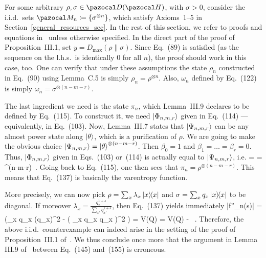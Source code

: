 \documentclass[11pt,notitlepage,tightenlines,nofootinbib,superscriptaddress]{revtex4-1}
\begin{document}
For some arbitrary $\rho,\sigma\in\D(\HH)$, with $\sigma>0$, consider the i.i.d.\ sets $\MM_n \coloneqq \{\sigma^{\otimes n}\}$, which satisfy Axioms~1--5 in Section~\ref{general_resources_sec}. In the rest of this section, we refer to proofs and equations in~\cite{Brandao2010} unless otherwise specified. In the direct part of the proof of Proposition~III.1, set $y = D_{\max}(\rho\|\sigma)$. Since Eq.~(89) is satisfied (as the sequence on the l.h.s.\ is identically $0$ for all $n$), the proof should work in this case, too. One can verify that under these assumptions the state $\rho_n$ constructed in Eq.~(90) using Lemma~C.5 is simply $\rho_n = \rho^{\otimes n}$. Also, $\omega_n$ defined by Eq.~(122) is simply $\omega_n = \sigma^{\otimes (n-m-r)}$. 

The last ingredient we need is the state $\pi_n$, which Lemma~III.9 declares to be defined by Eq.~(115). To construct it, we need $\ket{\Phi_{n,m,r}}$ given in Eq.~(114) --- equivalently, in Eq.~(103).
Now, Lemma~III.7 states that $\ket{\Psi_{n,m,r}}$ can be any almost power state along $\ket{\theta}$, which is a purification of $\rho$. We are going to make the obvious choice $\ket{\Psi_{n,m,r}} = \ket{\theta}^{\otimes (n-m-r)}$. Then $\beta_0 = 1$ and $\beta_1 = \ldots = \beta_r = 0$. Thus, $\ket{\Phi_{n,m,r}}$ given in Eqs.~(103) or~(114) is actually equal to $\ket{\Psi_{n,m,r}}$, i.e.
\bb
{} =  = \ket{\theta}^{\otimes(n-m-r)}\, .
\ee
Going back to Eq.~(115), one then sees that $\pi_n = \rho^{\otimes(n-m-r)}$. This means that Eq.~(137) is basically the varentropy function.

More precisely, we can now pick $\rho = \sum_x \lambda_x \ket{x}\!\!\bra{x}$ and $\sigma = \sum_x q_x \ket{x}\!\!\bra{x}$ to be diagonal. If moreover $\lambda_x = \frac{q_x^{1+s}}{\sum_{x'} q_{x'}^{1+s}}$, then Eq.~(137) yields immediately
\bb
\left|f''_n(s)\right| =  \left(\sum_x q_x (\log q_x)^2 - \left( \sum_x q_x \log q_x \right)^2 \right) =  V(Q) = V(Q) - \, .
\ee
Therefore, the above i.i.d.\ counterexample can indeed arise in the setting of the proof of Proposition~III.1 of~\cite{Brandao2010}. We thus conclude once more that the argument in Lemma III.9 of~\cite{Brandao2010} between Eq.~(145) and~(155) is erroneous.
\end{document}
